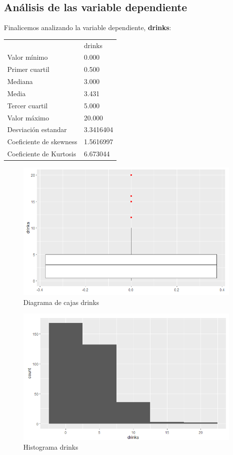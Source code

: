 \subsection{Análisis de las variable dependiente}\label{drinks}
Finalicemos analizando la variable dependiente, \textbf{drinks}:
\begin{table}[h!]
	\centering
	\begin{tabular}{ll}
		& drinks    \\
		Valor mínimo            & 0.000     \\
		Primer cuartil          & 0.500     \\
		Mediana                 & 3.000     \\
		Media                   & 3.431     \\
		Tercer cuartil          & 5.000     \\
		Valor máximo            & 20.000    \\ \hline
		Desviación estandar     & 3.3416404 \\ \hline
		Coeficiente de skewness & 1.5616997 \\
		Coeficiente de Kurtosis & 6.673044 
	\end{tabular}
\end{table}
\newpage
\begin{figure}[h!]
	\centering
	\includegraphics[width=0.7\linewidth]{figures/box_6}
	\caption{Diagrama de cajas drinks}
	\label{fig:box6}
\end{figure}

\begin{figure}[h!]
	\centering
	\includegraphics[width=0.7\linewidth]{figures/hist_6}
	\caption{Histograma drinks}
	\label{fig:hist6}
\end{figure}

